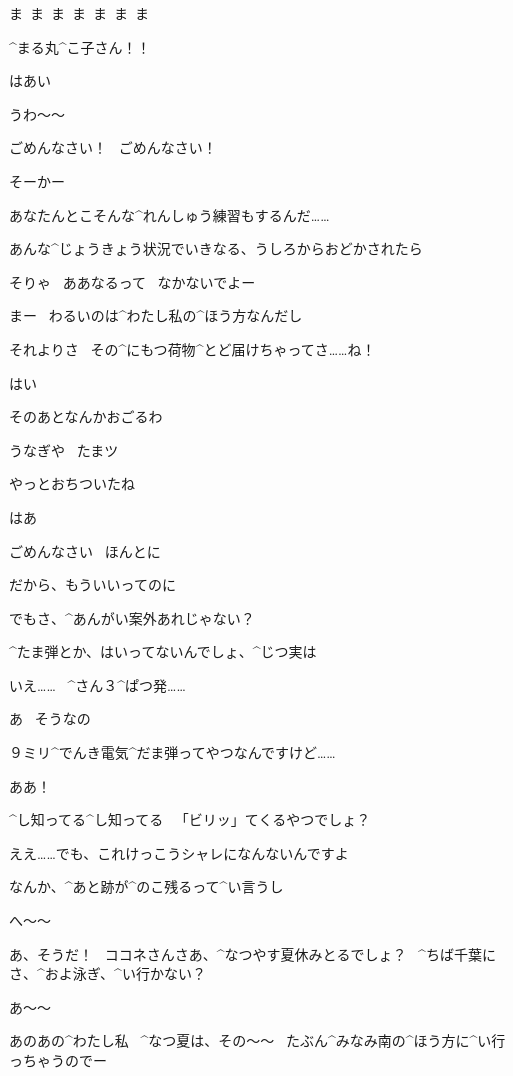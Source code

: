 \Kokone ま\ ま\ ま\ ま\ ま\ ま\ ま

\Kokone ^{まる}{丸}^{こ}{子}さん！！

\Maruko はあい

\page
\Kokone うわ〜〜

\Kokone ごめんなさい！
\ ごめんなさい！

\Maruko そーかー

\Maruko あなたんとこそんな^{れんしゅう}{練習}もするんだ……

\page
\Maruko あんな^{じょうきょう}{状況}でいきなる、うしろからおどかされたら

\Maruko そりゃ
\ ああなるって
\ なかないでよー

\Maruko まー
\ わるいのは^{わたし}{私}の^{ほう}{方}なんだし

\Maruko それよりさ
\ その^{にもつ}{荷物}^{とど}{届}けちゃってさ……ね！

\Kokone はい

\Maruko そのあとなんかおごるわ

\page
\Sign うなぎや
\ たまツ

\page
\Maruko やっとおちついたね

\Kokone はあ

\Kokone ごめんなさい
\ ほんとに

\Maruko だから、もういいってのに

\page
\Maruko でもさ、^{あんがい}{案外}あれじゃない？

\Maruko ^{たま}{弾}とか、はいってないんでしょ、^{じつ}{実}は

\Kokone いえ……
\ ^{さん}{３}^{ぱつ}{発}……

\Maruko あ
\ そうなの

\Kokone ９ミリ^{でんき}{電気}^{だま}{弾}ってやつなんですけど……

\Maruko ああ！

\Maruko ^{し}{知}ってる^{し}{知}ってる
\ 「ビリッ」てくるやつでしょ？

\Kokone ええ……でも、これけっこうシャレになんないんですよ

\Kokone なんか、^{あと}{跡}が^{のこ}{残}るって^{い}{言}うし

\Maruko へ〜〜

\page
\Maruko あ、そうだ！
\ ココネさんさあ、^{なつやす}{夏休}みとるでしょ？
\ ^{ちば}{千葉}にさ、^{およ}{泳}ぎ、^{い}{行}かない？

\Kokone あ〜〜

\Kokone あのあの^{わたし}{私}
\ ^{なつ}{夏}は、その〜〜
\ たぶん^{みなみ}{南}の^{ほう}{方}に^{い}{行}っちゃうのでー

